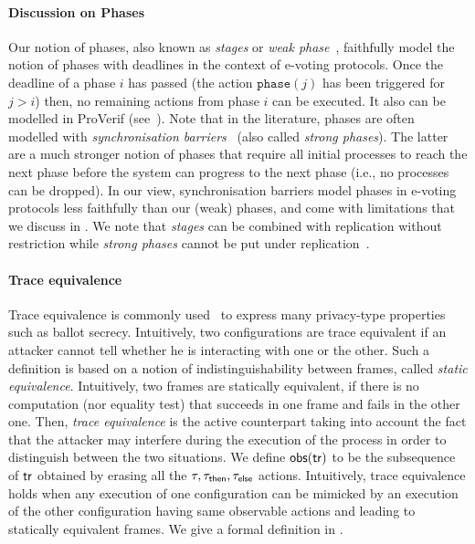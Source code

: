 \paragraph{\textbf{Discussion on Phases}}
\label{subsec:discu-phase}
Our notion of phases, also known as {\em stages} or {\em weak
phase}~\cite{vote-ifip,BlanchetAbadiFournetJLAP08},
faithfully model the notion of phases with deadlines in the context of e-voting protocols.
Once the deadline of a phase $i$ has passed (\ie the action $\mathtt{phase}(j)$ has been triggered for
$j>i$) then, no remaining actions from phase $i$ can be executed. It also can be modelled in ProVerif
(see~\cite{BlanchetAbadiFournetJLAP08,PVmanual,vote-ifip,vote-CSF08-maffei}).
Note that in the literature, phases are often modelled with {\em synchronisation barriers}~\cite{vote-ifip,vote-CSF16}
(also called {\em strong phases}). The latter are a much
stronger notion of phases that require all initial processes to reach
the next phase before the system can progress to the next phase (i.e.,
no processes can be dropped). In our view, synchronisation barriers
model phases in e-voting protocols less faithfully than our (weak)
phases, and come with limitations that we discuss in
.
We note that {\em stages} can be combined with replication without restriction
while {\em strong phases} cannot be put under replication~\cite{PVmanual,vote-CSF16}.

\paragraph{\textbf{Trace equivalence}}
\label{subsec:trace-equiv}
Trace equivalence is commonly used~\cite{surveyJLAMP16}
 to express many privacy-type properties such as ballot secrecy.
 Intuitively, two configurations are trace equivalent if an attacker
 cannot tell whether he is interacting with one or the other.
 Such a definition is based on a notion of indistinguishability
 between  frames, called \emph{static equivalence}.
 Intuitively, two frames are statically equivalent,
 if there is no computation (nor equality test) that succeeds in
 one frame and fails in the other one.
Then, \emph{trace equivalence} is the active counterpart
taking into account the fact that the attacker may
interfere during the execution of the process in order to distinguish
between the two situations.
We define $\mathsf{obs}(\mathsf{tr})$ to be the subsequence of $\mathsf{tr}$
obtained by erasing all the $\tau,\tau_{\mathsf{then}},\tau_{\mathsf{else}}$ actions.
Intuitively, trace equivalence holds when any execution of one
configuration can be mimicked by an execution of the other configuration
having same observable actions and leading to statically equivalent frames.
We give a formal definition 
in .

